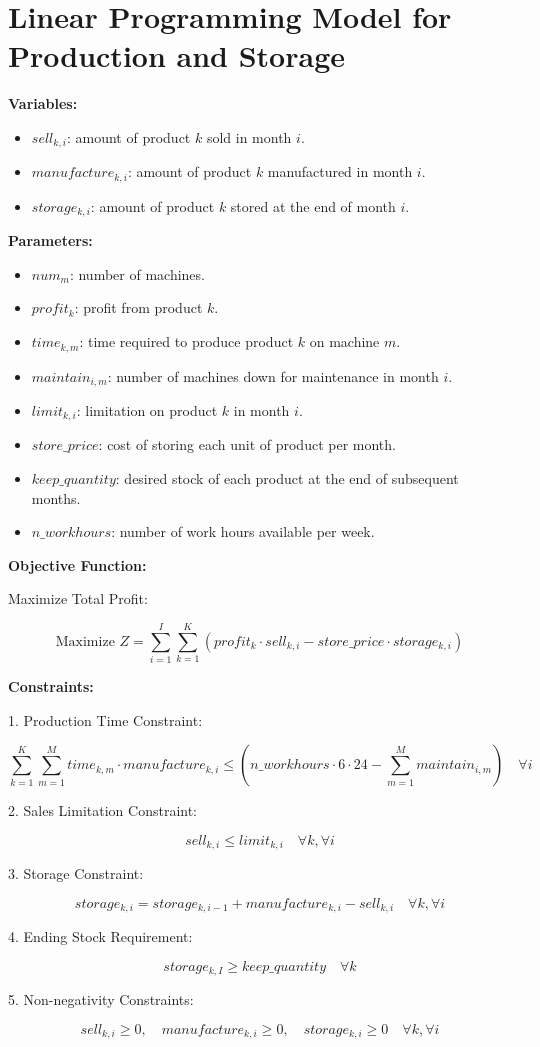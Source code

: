 \documentclass{article}
\begin{document}
\section*{Linear Programming Model for Production and Storage}

\textbf{Variables:}

\begin{itemize}
    \item $sell_{k,i}$: amount of product $k$ sold in month $i$.
    \item $manufacture_{k,i}$: amount of product $k$ manufactured in month $i$.
    \item $storage_{k,i}$: amount of product $k$ stored at the end of month $i$.
\end{itemize}

\textbf{Parameters:}

\begin{itemize}
    \item $num_m$: number of machines.
    \item $profit_k$: profit from product $k$.
    \item $time_{k,m}$: time required to produce product $k$ on machine $m$.
    \item $maintain_{i,m}$: number of machines down for maintenance in month $i$.
    \item $limit_{k,i}$: limitation on product $k$ in month $i$.
    \item $store\_price$: cost of storing each unit of product per month.
    \item $keep\_quantity$: desired stock of each product at the end of subsequent months.
    \item $n\_workhours$: number of work hours available per week.
\end{itemize}

\textbf{Objective Function:}

Maximize Total Profit:

\[
\text{Maximize } Z = \sum_{i=1}^{I} \sum_{k=1}^{K} (profit_k \cdot sell_{k,i} - store\_price \cdot storage_{k,i})
\]

\textbf{Constraints:}

1. Production Time Constraint:

\[
\sum_{k=1}^{K} \sum_{m=1}^{M} time_{k,m} \cdot manufacture_{k,i} \leq (n\_workhours \cdot 6 \cdot 24 - \sum_{m=1}^{M} maintain_{i,m}) \quad \forall i
\]

2. Sales Limitation Constraint:

\[
sell_{k,i} \leq limit_{k,i} \quad \forall k, \forall i
\]

3. Storage Constraint:

\[
storage_{k,i} = storage_{k,i-1} + manufacture_{k,i} - sell_{k,i} \quad \forall k, \forall i
\]

4. Ending Stock Requirement:

\[
storage_{k,I} \geq keep\_quantity \quad \forall k
\]

5. Non-negativity Constraints:

\[
sell_{k,i} \geq 0, \quad manufacture_{k,i} \geq 0, \quad storage_{k,i} \geq 0 \quad \forall k, \forall i
\]
\end{document}

